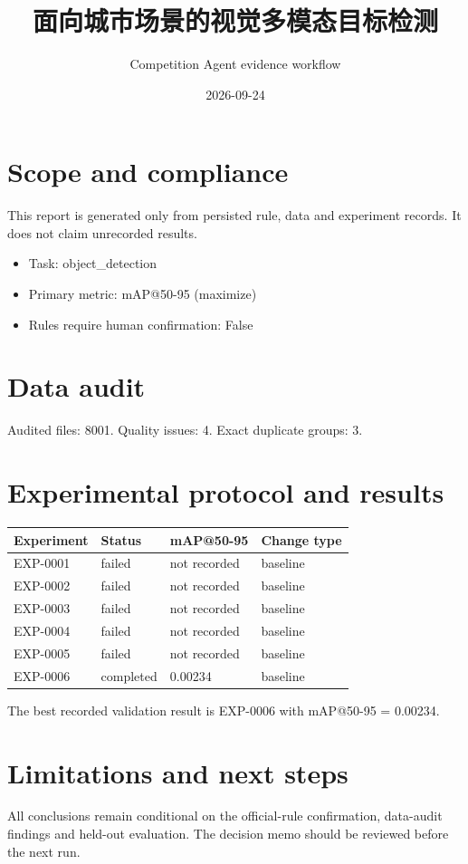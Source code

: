 \documentclass[11pt]{ctexart}
\title{面向城市场景的视觉多模态目标检测}
\author{Competition Agent evidence workflow}
\date{2026-09-24}
\begin{document}
\maketitle
\section{Scope and compliance}
This report is generated only from persisted rule, data and experiment records. It does not claim unrecorded results.
\begin{itemize}
\item Task: object\_detection
\item Primary metric: mAP@50-95 (maximize)
\item Rules require human confirmation: False
\end{itemize}
\section{Data audit}
Audited files: 8001. Quality issues: 4. Exact duplicate groups: 3.
\section{Experimental protocol and results}
\begin{center}\begin{tabular}{llll}\toprule
Experiment & Status & mAP@50-95 & Change type \\ \midrule
EXP-0001 & failed & not recorded & baseline \\
EXP-0002 & failed & not recorded & baseline \\
EXP-0003 & failed & not recorded & baseline \\
EXP-0004 & failed & not recorded & baseline \\
EXP-0005 & failed & not recorded & baseline \\
EXP-0006 & completed & 0.00234 & baseline \\
\bottomrule\end{tabular}\end{center}
The best recorded validation result is EXP-0006 with mAP@50-95 = 0.00234.
\section{Limitations and next steps}
All conclusions remain conditional on the official-rule confirmation, data-audit findings and held-out evaluation. The decision memo should be reviewed before the next run.
\end{document}
